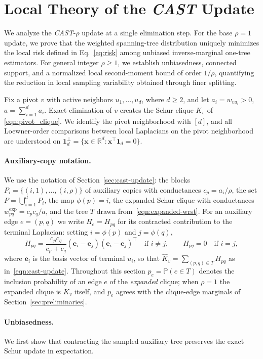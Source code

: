 \documentclass{article}
\newcommand{\CAST}{\textit{CAST}\xspace}
\newcommand{\1}{\mathbbm{1}}
\theoremstyle{plain}
\renewcommand{\Pr}[1]{\mathbb{P}\left(#1\right)}
\begin{document}
\section{Local Theory of the \CAST{} Update}
\label{sec:local-theory}

We analyze the \CAST-$\rho$ update at a single elimination step. For
the base $\rho=1$ update, we prove that the weighted spanning-tree
distribution uniquely minimizes the local risk defined in
Eq.~\eqref{eq:risk} among unbiased inverse-marginal
one-tree estimators. For general integer $\rho\geq 1$, we establish
unbiasedness, connected support, and a normalized local second-moment
bound of order $1/\rho$, quantifying the reduction in local sampling
variability obtained through finer splitting.

Fix a pivot $v$ with active neighbors $u_1,\ldots,u_d$, where
$d\geq 2$, and let $a_i=w_{vu_i}>0$, $a=\sum_{i=1}^{d}a_i$. Exact
elimination of $v$ creates the Schur clique $K_v$ of
\eqref{eqn:pivot_clique}. We identify the pivot neighborhood with
$[d]$, and all Loewner-order comparisons between local Laplacians on the pivot neighborhood are
understood on
$\mathbf{1}_d^\perp=\{\mathbf x\in\mathbb R^d:
\mathbf x^\top\mathbf 1_d=0\}$.

\paragraph{\textbf{Auxiliary-copy notation}.}
We use the notation of Section~\ref{sec:cast-update}: the blocks
$P_i=\{(i,1),\ldots,(i,\rho)\}$ of auxiliary copies with conductances
$c_p=a_i/\rho$, the set $P=\bigcup_{i=1}^{d}P_i$, the map $\phi(p)=i$,
the expanded Schur clique with conductances
$w^{\mathrm{exp}}_{pq}=c_pc_q/a$, and the tree $T$ drawn
from~\eqref{eqn:expanded-wrst}. For an auxiliary edge $e=(p,q)$ we
write $H_e=H_{pq}$ for its contracted contribution to the terminal
Laplacian: setting $i=\phi(p)$ and $j=\phi(q)$,
\[
H_{pq}=\frac{c_pc_q}{c_p+c_q}
(\mathbf e_i-\mathbf e_j)(\mathbf e_i-\mathbf e_j)^\top
\quad\text{if } i\neq j,
\qquad H_{pq}=0 \quad\text{if } i=j,
\]
where $\mathbf e_i$ is the basis vector of terminal $u_i$, so that
$\widehat K_v=\sum_{(p,q)\in T}H_{pq}$ as in~\eqref{eqn:cast-update}.
Throughout this section $p_e=\Pr{e\in T}$ denotes the inclusion
probability of an edge $e$ of the \emph{expanded} clique; when
$\rho=1$ the expanded clique is $K_v$ itself, and $p_e$ agrees with
the clique-edge marginals of Section~\ref{sec:preliminaries}.

\paragraph{\textbf{Unbiasedness}.}
We first show that contracting the sampled auxiliary tree preserves
the exact Schur update in expectation.
\end{document}
